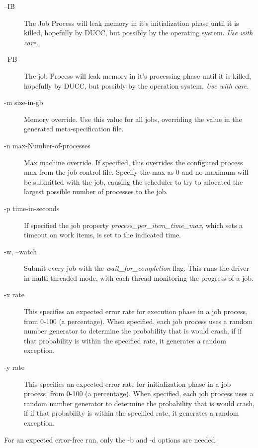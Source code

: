 \begin{description}
      \item[--IB] The Job Process will leak memory in it's initialization phase until it is killed, hopefully by
        DUCC, but possibly by the operating system.  {\em Use with care.}.
      \item[--PB] The job Process will leak memory in it's processing phase until it is killed, hopefully 
        by DUCC, but possibly by the operation system. {\em Use with care.}
      \item[-m size-in-gb] Memory override.  Use this value for all jobs, overriding the value
        in the generated meta-specification file.
      \item[-n max-Number-of-processes] Max machine override.  If specified, this overrides the configured process max
        from the job control file.  Specify the max as $0$ and no maximum will be submitted with the job,
        causing the scheduler to try to allocated the largest possible number of processes to the job.
      \item[-p time-in-seconds] If specified the job property {\em process\_per\_item\_time\_max},
        which sets a timeout on work items, is set to the indicated time.
      \item[-w, --watch] Submit every job with the {\em wait\_for\_completion} flag. This runs the
        driver in multi-threaded mode, with each thread monitoring the progress of a job.
      \item[-x rate] This specifies an expected error rate for execution phase in a job process, from 0-100 (a
        percentage).  When specified, each job process uses a random number generator to determine
        the probability that is would crash, if if that probability is within the specified rate, it
        generates a random exception.
      \item[-y rate]  This specifies an expected error rate for initialization phase in a job process, from 0-100 (a
        percentage).  When specified, each job process uses a random number generator to determine
        the probability that is would crash, if if that probability is within the specified rate, it
        generates a random exception.
    \end{description}

    For an expected error-free run, only the -b and -d options are needed.

    
